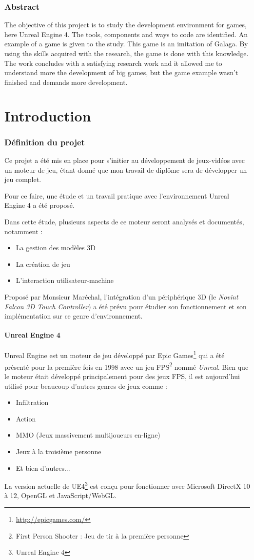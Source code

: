 \documentclass[11pt, a4paper, oneside]{article}
\begin{document}
\section{Abstract}
The objective of this project is to study the development environment for games, here Unreal Engine 4. The tools, components and ways to code are identified. An example of a game is given to the study. This game is an imitation of Galaga. By using the skills acquired with the research, the game is done with this knowledge. The work concludes with a satisfying research work and it allowed me to understand more the development of big games, but the game example wasn't finished and demands more development.
\newpage
\tableofcontents
\newpage
\part{Introduction}
\section{Définition du projet}
Ce projet a été mis en place pour s'initier au développement de jeux-vidéos avec un moteur de jeu, étant donné que mon travail de diplôme sera de développer un jeu complet.

Pour ce faire, une étude et un travail pratique avec l'environnement Unreal Engine 4 a été proposé.

Dans cette étude, plusieurs aspects de ce moteur seront analysés et documentés, notamment :
\begin{itemize}
\item La gestion des modèles 3D
\item La création de jeu
\item L'interaction utilisateur-machine\\
\end{itemize}
Proposé par Monsieur Maréchal, l'intégration d'un périphérique 3D (le \textit{Novint Falcon 3D Touch Controller}) a été prévu pour étudier son fonctionnement et son implémentation sur ce genre d'environnement.
\subsection{Unreal Engine 4}
\label{sec:ue4definition}
Unreal Engine est un moteur de jeu développé par Epic Games\footnote{\url{http://epicgames.com/}} qui a été présenté pour la première fois en 1998 avec un jeu FPS\footnote{First Person Shooter : Jeu de tir à la première personne} nommé \textit{Unreal}. Bien que le moteur était développé principalement pour des jeux FPS, il est aujourd'hui utilisé pour beaucoup d'autres genres de jeux comme :
\begin{itemize}
\item Infiltration
\item Action
\item MMO (Jeux massivement multijoueurs en-ligne)
\item Jeux à la troisième personne
\item Et bien d'autres...
\end{itemize}
La version actuelle de UE4\footnote{Unreal Engine 4} est conçu pour fonctionner avec Microsoft DirectX 10 à 12, OpenGL et JavaScript/WebGL.
\newpage
\end{document}
